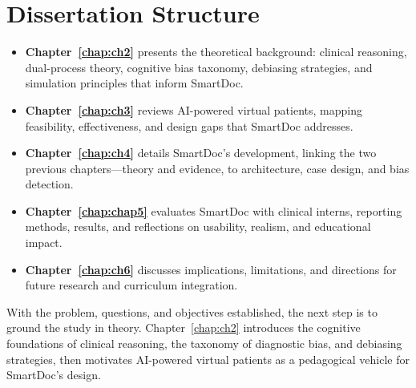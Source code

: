 \section{Dissertation Structure}
\label{sec:structure}

\begin{itemize}
  \item \textbf{Chapter~\ref{chap:ch2}} presents the theoretical background: clinical reasoning, dual-process theory, cognitive bias taxonomy, debiasing strategies, and simulation principles that inform SmartDoc.
  \item \textbf{Chapter~\ref{chap:ch3}} reviews AI-powered virtual patients, mapping feasibility, effectiveness, and design gaps that SmartDoc addresses.
  \item \textbf{Chapter~\ref{chap:ch4}} details SmartDoc’s development, linking the two previous chapters—theory and evidence, to architecture, case design, and bias detection.
  \item \textbf{Chapter~\ref{chap:chap5}} evaluates SmartDoc with clinical interns, reporting methods, results, and reflections on usability, realism, and educational impact.
  \item \textbf{Chapter~\ref{chap:ch6}} discusses implications, limitations, and directions for future research and curriculum integration.
\end{itemize}

With the problem, questions, and objectives established, the next step is to ground the study in theory. Chapter~\ref{chap:ch2} introduces the cognitive foundations of clinical reasoning, the taxonomy of diagnostic bias, and debiasing strategies, then motivates AI-powered virtual patients as a pedagogical vehicle for SmartDoc’s design.
